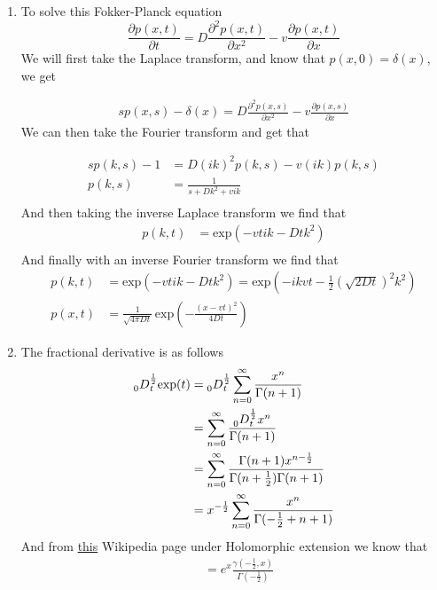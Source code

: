 \documentclass[12pt]{amsart}
\theoremstyle{definition}
\begin{document}
\begin{enumerate}
    \item To solve this Fokker-Planck equation
    $$\frac{\partial p(x,t)}{\partial t}=D\frac{\partial^2 p(x,t)}{\partial x^2}- v\frac{\partial p(x,t)}{\partial x}$$
    We will first take the Laplace transform, and know that $p(x,0)=\delta(x)$, we get 

    \begin{align*}
        sp(x,s)-\delta(x)=D\frac{\partial^2 p(x,s)}{\partial x^2}- v\frac{\partial p(x,s)}{\partial x}
    \end{align*}
    We can then take the Fourier transform and get that

    \begin{align*}
        sp(k,s)-1&=D (ik)^2 p(k,s)- v(ik)p(k,s)\\
        p(k,s)&=\frac{1}{s+Dk^2+vik}\\
    \end{align*}
    And then taking the inverse Laplace transform we find that %
    \begin{align*}
        p(k,t)&=\text{exp}(-vtik-Dtk^2)\\
    \end{align*}
    And finally with an inverse Fourier transform we find that   
    \begin{align*}
        p(k,t)&=\text{exp}(-vtik-Dtk^2)=\text{exp}(-ik vt-\frac{1}{2}(\sqrt{2Dt})^2k^2)\\  %
        p(x,t) &= \frac{1}{\sqrt{4\pi D t}}\,\text{exp}\left( -\frac{\left(x-vt\right)^2}{4Dt}\right)
    \end{align*}

    \item The fractional derivative is as follows
    \begin{align*}
        \prescript{}{0}{D}^{\frac{1}{2}}_{t}\text{exp}(t) &= \prescript{}{0}{D}^{\frac{1}{2}}_{t}\sum_{n=0}^{\infty}\frac{x^n}{\Gamma(n+1)}\\
        &= \sum_{n=0}^{\infty}\frac{\prescript{}{0}{D}^{\frac{1}{2}}_{t}x^n}{\Gamma(n+1)}\\
        &= \sum_{n=0}^{\infty}\frac{\Gamma(n+1)x^{n-\frac{1}{2}}}{\Gamma(n+\frac{1}{2})\Gamma(n+1)}\\
        &= x^{-\frac{1}{2}}\sum_{n=0}^{\infty}\frac{x^{n}}{\Gamma(-\frac{1}{2}+n+1)}\\
    \end{align*}
    And from \href{https://en.wikipedia.org/wiki/Incomplete_gamma_function}{this} Wikipedia page under Holomorphic extension we know that 
    \begin{align*}
        &= e^{x}\frac{\gamma(-\frac{1}{2},x)}{\Gamma(-\frac{1}{2})}
    \end{align*}



\end{enumerate}
\end{document}
